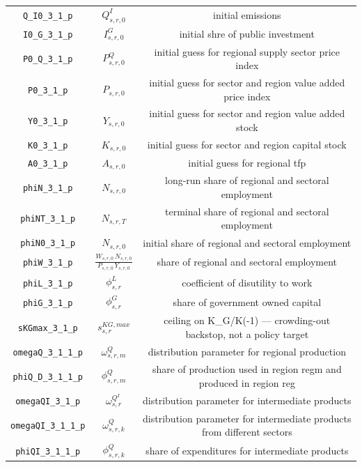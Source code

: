 \begin{center}
\begin{longtable}{ccc}
\texttt{Q\_I0\_3\_1\_p} & ${Q^I_{s,r,0}}$ & initial emissions\\
\texttt{I0\_G\_3\_1\_p} & ${I^G_{s,r,0}}$ & initial shre of public investment\\
\texttt{P0\_Q\_3\_1\_p} & ${P^Q_{s,r,0}}$ & initial guess for regional supply sector price index\\
\texttt{P0\_3\_1\_p} & ${P_{s,r,0}}$ & initial guess for sector and region value added price index\\
\texttt{Y0\_3\_1\_p} & ${Y_{s,r,0}}$ & initial guess for sector and region value added stock\\
\texttt{K0\_3\_1\_p} & ${K_{s,r,0}}$ & initial guess for sector and region capital stock\\
\texttt{A0\_3\_1\_p} & ${A_{s,r,0}}$ & initial guess for regional tfp\\
\texttt{phiN\_3\_1\_p} & ${N_{s,r,0}}$ & long-run share of regional and sectoral employment\\
\texttt{phiNT\_3\_1\_p} & ${N_{s,r,T}}$ & terminal share of regional and sectoral employment\\
\texttt{phiN0\_3\_1\_p} & ${N_{s,r,0}}$ & initial share of regional and sectoral employment\\
\texttt{phiW\_3\_1\_p} & $\frac{W_{s,r,0} \, N_{s,r,0}}{P_{s,r,0} \, Y_{s,r,0}}$ & share of regional and sectoral employment\\
\texttt{phiL\_3\_1\_p} & ${\phi^{L}_{s,r}}$ & coefficient of disutility to work\\
\texttt{phiG\_3\_1\_p} & ${\phi^{G}_{s,r}}$ & share of government owned capital\\
\texttt{sKGmax\_3\_1\_p} & ${s^{KG,max}_{s,r}}$ & ceiling on K\_G/K(-1) — crowding-out backstop, not a policy target\\
\texttt{omegaQ\_3\_1\_1\_p} & ${\omega^{Q}_{s,r,m}}$ & distribution parameter for regional production\\
\texttt{phiQ\_D\_3\_1\_1\_p} & ${\phi^{Q}_{s,r,m}}$ & share of production used in region regm and produced in region reg\\
\texttt{omegaQI\_3\_1\_p} & ${\omega^{Q^{I}}_{s,r}}$ & distribution parameter for intermediate products\\
\texttt{omegaQI\_3\_1\_1\_p} & ${\omega^{Q}_{s,r,k}}$ & distribution parameter for intermediate products from different sectors\\
\texttt{phiQI\_3\_1\_1\_p} & ${\phi^{Q}_{s,r,k}}$ & share of expenditures for intermediate products\\

\end{longtable}
\end{center}
